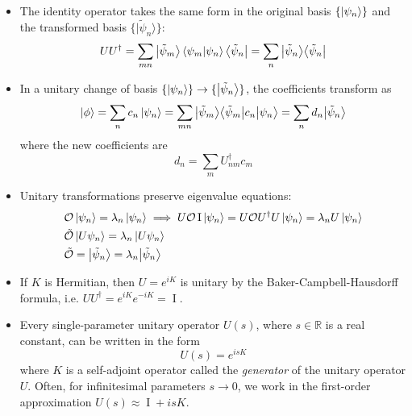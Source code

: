 \documentclass[11pt, a4paper]{article}
\newcommand{\Herm}{Hermitian\xspace}
\renewcommand{\t}[1]{\tilde{#1}}
\renewcommand{\O}{\mathcal{O}}  %
\newcommand{\II}{\operatorname{I}}  %
\newcommand{\p}{\psi}  %
\newcommand{\bket}[1]{\big | {#1} \big \rangle }
\newcommand{\bbra}[1]{ \big \langle {#1} \big |  }
\newcommand{\bmel}[3]{\big \langle {#1} \big | {#2} \big | {#3} \big \rangle}  %
\begin{document}
\begin{itemize}
	\item The identity operator takes the same form in the original basis $ \{\ket{\p_{n}}\} $ and the transformed basis $ \{\bket{\t{\p}_{n}}\} $:
	\begin{equation*}
		UU^{\dagger} = \sum_{mn} \bket{\t{\p}_{m}} \braket{\p_{m}}{\p_{n}} \bbra{\t{\p}_{n}} = \sum_{n}\bket{\t{\p}_{n}}\bbra{\t{\p}_{n}}
	\end{equation*}
	
	\item In a unitary change of basis $ \{\ket{\p_{n}}\} \to \{\bket{\t{\p}_{n}}\} $, the coefficients transform as
	\begin{equation*}
		\ket{\phi} = \sum_{n}c_{n}\ket{\p_{n}} = \sum_{mn}\bket{\t{\p}_{m}}\bmel{\t{\p}_{m}}{c_{n}}{\p_{n}} = \sum_{n}d_{n}\bket{\tilde{\p}_{n}}
	\end{equation*}
	where the new coefficients are
	\begin{equation*}
		d_{n} = \sum_{m}U_{nm}^{\dagger}c_{m}
	\end{equation*}
	
	\item Unitary transformations preserve eigenvalue equations:
	\begin{align*}
		&\O\ket{\psi_{n}} = \lambda_{n} \ket{\p_{n}} \implies U \O \II \ket{\p_{n}} = U \O U^{\dagger}U \ket{\p_{n}} = \lambda_{n} U\ket{\p_{n}}\\
		&\t{\O} \ket{U\p_{n}} = \lambda_{n}\ket{U\p_{n}}\\
		&\t{\O} = \bket{\t{\p}_{n}} = \lambda_{n} \bket{\t{\p}_{n}}
	\end{align*}
	
	\item If $ K $ is \Herm, then $ U = e^{iK} $ is unitary by the Baker-Campbell-Hausdorff formula, i.e. $ UU^{\dagger} = e^{iK}e^{-iK} = \II $.
	
	\item Every single-parameter unitary operator $ U(s) $, where $ s \in \mathbb{R} $ is a real constant, can be written in the form 
	\begin{equation*}
		U(s) = e^{isK}
	\end{equation*}
    where $ K $ is a self-adjoint operator called the \textit{generator} of the unitary operator $ U $. Often, for infinitesimal parameters $ s \to 0 $, we work in the first-order approximation $ U(s) \approx \II + isK $.
	
\end{itemize}
\end{document}
